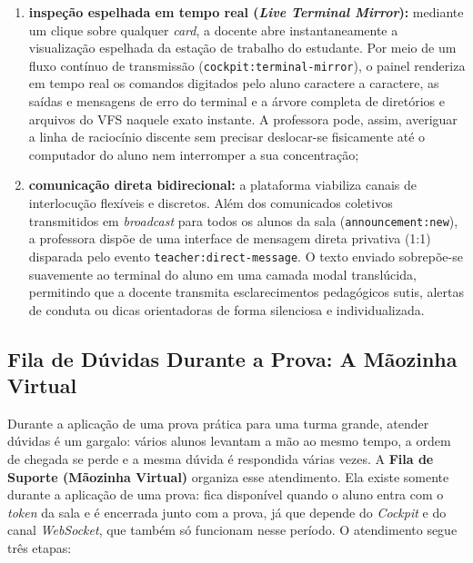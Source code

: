 \begin{enumerate}
    \item \textbf{inspeção espelhada em tempo real (\textit{Live Terminal Mirror}):} mediante um clique sobre qualquer \textit{card}, a docente abre instantaneamente a visualização espelhada da estação de trabalho do estudante. Por meio de um fluxo contínuo de transmissão (\texttt{cockpit:terminal-mirror}), o painel renderiza em tempo real os comandos digitados pelo aluno caractere a caractere, as saídas e mensagens de erro do terminal e a árvore completa de diretórios e arquivos do VFS naquele exato instante. A professora pode, assim, averiguar a linha de raciocínio discente sem precisar deslocar-se fisicamente até o computador do aluno nem interromper a sua concentração;

    \item \textbf{comunicação direta bidirecional:} a plataforma viabiliza canais de interlocução flexíveis e discretos. Além dos comunicados coletivos transmitidos em \textit{broadcast} para todos os alunos da sala (\texttt{announcement:new}), a professora dispõe de uma interface de mensagem direta privativa (1:1) disparada pelo evento \texttt{teacher:direct-message}. O texto enviado sobrepõe-se suavemente ao terminal do aluno em uma camada modal translúcida, permitindo que a docente transmita esclarecimentos pedagógicos sutis, alertas de conduta ou dicas orientadoras de forma silenciosa e individualizada.
\end{enumerate}

\subsection{Fila de Dúvidas Durante a Prova: A Mãozinha Virtual}
\label{sec:fila-suporte}

Durante a aplicação de uma prova prática para uma turma grande, atender dúvidas é um gargalo: vários alunos levantam a mão ao mesmo tempo, a ordem de chegada se perde e a mesma dúvida é respondida várias vezes. A \textbf{Fila de Suporte (Mãozinha Virtual)} organiza esse atendimento. Ela existe somente durante a aplicação de uma prova: fica disponível quando o aluno entra com o \textit{token} da sala e é encerrada junto com a prova, já que depende do \textit{Cockpit} e do canal \textit{WebSocket}, que também só funcionam nesse período. O atendimento segue três etapas:

